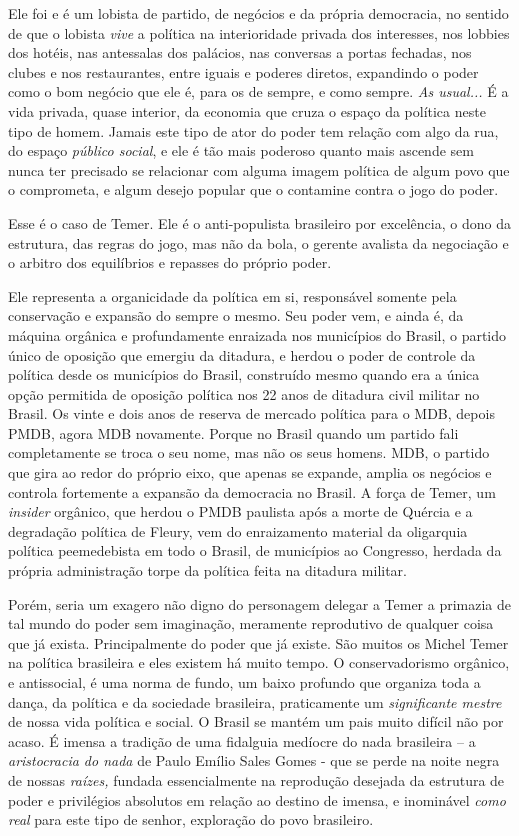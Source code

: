 Ele foi e é um lobista de partido, de negócios e da própria democracia,
no sentido de que o lobista \emph{vive} a política na interioridade
privada dos interesses, nos lobbies dos hotéis, nas antessalas dos
palácios, nas conversas a portas fechadas, nos clubes e nos
restaurantes, entre iguais e poderes diretos, expandindo o poder como o
bom negócio que ele é, para os de sempre, e como sempre. \emph{As
usual...} É a vida privada, quase interior, da economia que cruza o
espaço da política neste tipo de homem. Jamais este tipo de ator do
poder tem relação com algo da rua, do espaço \emph{público social}, e
ele é tão mais poderoso quanto mais ascende sem nunca ter precisado se
relacionar com alguma imagem política de algum povo que o comprometa, e
algum desejo popular que o contamine contra o jogo do poder.

Esse é o caso de Temer. Ele é o anti-populista brasileiro por
excelência, o dono da estrutura, das regras do jogo, mas não da bola, o
gerente avalista da negociação e o arbitro dos equilíbrios e repasses do
próprio poder.

Ele representa a organicidade da política em si, responsável somente
pela conservação e expansão do sempre o mesmo. Seu poder vem, e ainda é,
da máquina orgânica e profundamente enraizada nos municípios do Brasil,
o partido único de oposição que emergiu da ditadura, e herdou o poder de
controle da política desde os municípios do Brasil, construído mesmo
quando era a única opção permitida de oposição política nos 22 anos de
ditadura civil militar no Brasil. Os vinte e dois anos de reserva de
mercado política para o MDB, depois PMDB, agora MDB novamente. Porque no
Brasil quando um partido fali completamente se troca o seu nome, mas não
os seus homens. MDB, o partido que gira ao redor do próprio eixo, que
apenas se expande, amplia os negócios e controla fortemente a expansão
da democracia no Brasil. A força de Temer, um \emph{insider} orgânico,
que herdou o PMDB paulista após a morte de Quércia e a degradação
política de Fleury, vem do enraizamento material da oligarquia política
peemedebista em todo o Brasil, de municípios ao Congresso, herdada da
própria administração torpe da política feita na ditadura militar.

Porém, seria um exagero não digno do personagem delegar a Temer a
primazia de tal mundo do poder sem imaginação, meramente reprodutivo de
qualquer coisa que já exista. Principalmente do poder que já existe. São
muitos os Michel Temer na política brasileira e eles existem há muito
tempo. O conservadorismo orgânico, e antissocial, é uma norma de fundo,
um baixo profundo que organiza toda a dança, da política e da sociedade
brasileira, praticamente um \emph{significante mestre} de nossa vida
política e social. O Brasil se mantém um pais muito difícil não por
acaso. É imensa a tradição de uma fidalguia medíocre do nada brasileira
-- a \emph{aristocracia do nada} de Paulo Emílio Sales Gomes - que se
perde na noite negra de nossas \emph{raízes,} fundada essencialmente na
reprodução desejada da estrutura de poder e privilégios absolutos em
relação ao destino de imensa, e inominável \emph{como real} para este
tipo de senhor, exploração do povo brasileiro.

